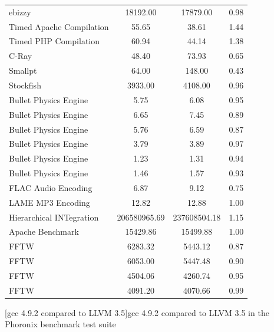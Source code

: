 \begin{appendix}
\begin{table}[htbp]
\begin{longtable}{l|c|c|c}
        ebizzy & 18192.00 & 17879.00 & 0.98 \\
        Timed Apache Compilation & 55.65 & 38.61 & 1.44 \\
        Timed PHP Compilation & 60.94 & 44.14 & 1.38 \\
        C-Ray & 48.40 & 73.93 & 0.65 \\
        Smallpt & 64.00 & 148.00 & 0.43 \\
        Stockfish & 3933.00 & 4108.00 & 0.96 \\
        Bullet Physics Engine & 5.75 & 6.08 & 0.95 \\
        Bullet Physics Engine & 6.65 & 7.45 & 0.89 \\
        Bullet Physics Engine & 5.76 & 6.59 & 0.87 \\
        Bullet Physics Engine & 3.79 & 3.89 & 0.97 \\
        Bullet Physics Engine & 1.23 & 1.31 & 0.94 \\
        Bullet Physics Engine & 1.46 & 1.57 & 0.93 \\
        FLAC Audio Encoding & 6.87 & 9.12 & 0.75 \\
        LAME MP3 Encoding & 12.82 & 12.88 & 1.00 \\
        Hierarchical INTegration & 206580965.69 & 237608504.18 & 1.15 \\
        Apache Benchmark & 15429.86 & 15499.88 & 1.00 \\
        FFTW & 6283.32 & 5443.12 & 0.87 \\
        FFTW & 6053.00 & 5447.48 & 0.90 \\
        FFTW & 4504.06 & 4260.74 & 0.95 \\
        FFTW & 4091.20 & 4070.66 & 0.99 \\
        \hline
    \end{longtable}
    [\ac{gcc} 4.9.2 compared to \ac{LLVM} 3.5]{\ac{gcc} 4.9.2 compared to \ac{LLVM} 3.5 in the Phoronix benchmark test suite\cite{LLVMvsGCC}}
    \label{table:llvmvsgcc}
\end{table}


\end{appendix}
